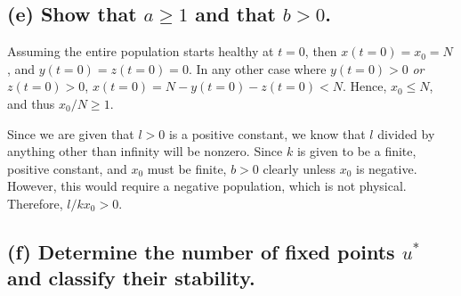 \documentclass[draft]{agujournal2019}
\begin{document}
\subsection{(e) Show that $a\geq1$ and that $b>0$. }
\label{ssec:p2e}

Assuming the entire population starts healthy at $t=0$, then $x(t=0)=x_0 = N$, and $y(t=0)=z(t=0)=0$. In any other case where $y(t=0)>0$ \emph{or} $z(t=0)>0$, $x(t=0)=N - y(t=0) - z(t=0) < N$. Hence, $x_0 \leq N$, and thus $x_0/N \geq 1$.
\par

Since we are given that $l>0$ is a positive constant, we know that $l$ divided by anything other than infinity will be nonzero. Since $k$ is given to be a finite, positive constant, and $x_0$ must be finite, $b>0$ clearly unless $x_0$ is negative. However, this would require a negative population, which is not physical. Therefore, $l/k x_0 > 0$.



\subsection{(f) Determine the number of fixed points $u^*$ and classify their stability. }
\label{ssec:p2f}
\end{document}
